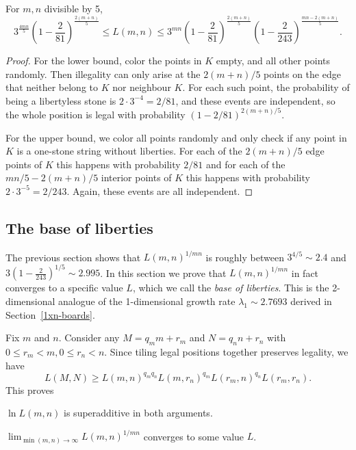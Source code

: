 \documentclass{article}
\begin{document}
\begin{theorem}
\label{asymp}
For $m,n$ divisible by 5,
\[ 3^\frac{4mn}{5}(1-\frac{2}{81})^\frac{2(m+n)}{5} \leq L(m,n) \leq
   3^{ mn  }(1-\frac{2}{81})^\frac{2(m+n)}{5}(1-\frac{2}{243})^\frac{mn-2(m+n)}{5}. \]
\end{theorem}

\begin{proof}
For the lower bound, color the points in $K$ empty, and all other
points randomly. Then illegality can only arise at the $2(m+n)/5$
points on the edge that neither belong to $K$ nor neighbour $K$. 
For each such point, the probability of being a libertyless stone
is $2\cdot 3^{-4}=2/81$, and these events are independent,
so the whole position is legal with probability $(1-2/81)^{2(m+n)/5}$.

For the upper bound, we color all points randomly and only check if any
point in $K$ is a one-stone string without liberties.
For each of the $2(m+n)/5$ edge points
of $K$ this happens with probability $2/81$ and for each of the
$mn/5-2(m+n)/5$ interior points of $K$ this happens with probability
$2\cdot 3^{-5}=2/243$. Again, these events are all independent.
\end{proof}

\subsection{The base of liberties}

The previous section shows that $L(m,n)^{1/mn}$ is roughly
between $3^{4/5} \sim 2.4$ and $3(1-\frac{2}{243})^{1/5} \sim 2.995$.
In this section we prove that $L(m,n)^{1/mn}$ in fact converges to
a specific value $L$, which we call the {\em base of liberties}.
This is the 2-dimensional analogue of the 1-dimensional growth rate
$\lambda_1 \sim 2.7693$ derived in Section~\ref{1xn-boards}.

Fix $m$ and $n$. Consider any $M=q_m m + r_m$ and
$N=q_n n + r_n$ with $0\leq r_m < m, 0\leq r_n < n$.
Since tiling legal positions together preserves legality, we have
\[ L(M,N) \geq L(m,n)^{q_m q_n} L(m,r_n)^{q_m} L(r_m,n)^{q_n} L(r_m,r_n). \]
This proves

\begin{theorem}
$\ln L(m,n)$ is superadditive in both arguments.
\label{super-additive}
\end{theorem}

\begin{theorem}
$\lim_{\min(m,n)\rightarrow \infty} L(m,n)^{1/m n}$ converges to some value $L$.
\label{base-of-liberties}
\end{theorem}
\end{document}
